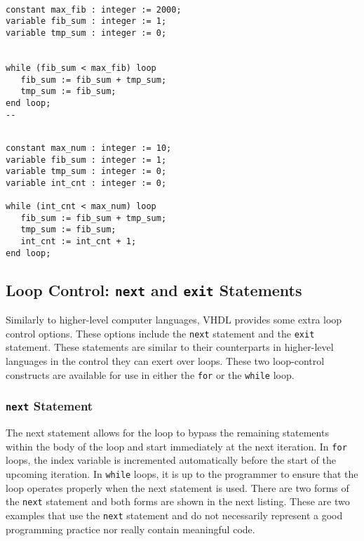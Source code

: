 \vspace{10pt}
\noindent
\begin{minipage}{0.5\linewidth}
\begin{lstlisting}

constant max_fib : integer := 2000;
variable fib_sum : integer := 1;
variable tmp_sum : integer := 0;


while (fib_sum < max_fib) loop
   fib_sum := fib_sum + tmp_sum;
   tmp_sum := fib_sum;
end loop;
--
\end{lstlisting}
\end{minipage}
\noindent
\begin{minipage}{0.5\linewidth}
\begin{lstlisting}

constant max_num : integer := 10; 
variable fib_sum : integer := 1; 
variable tmp_sum : integer := 0; 
variable int_cnt : integer := 0; 

while (int_cnt < max_num) loop
   fib_sum := fib_sum + tmp_sum; 
   tmp_sum := fib_sum; 
   int_cnt := int_cnt + 1; 
end loop;
\end{lstlisting}
\end{minipage}

\subsection{Loop Control: \texttt{next} and \texttt{exit} Statements}

Similarly to higher-level computer languages, VHDL provides some extra loop control options. These options include the \texttt{next} statement and the \texttt{exit} statement. These statements are similar to their counterparts in higher-level languages in the control they can exert over loops. These two loop-control constructs are available for use in either the \texttt{for} or the \texttt{while} loop. 

\subsubsection{\texttt{next} Statement}
The next statement allows for the loop to bypass the remaining statements within the body of the loop and start immediately at the next iteration. In \texttt{for} loops, the index variable is incremented automatically before the start of the upcoming iteration. In \texttt{while} loops, it is up to the programmer to ensure that the loop operates properly when the next statement is used. There are two forms of the \texttt{next} statement and both forms are shown in the next listing. These are two examples that use the \texttt{next} statement and do not necessarily represent a good programming practice nor really contain meaningful code.


